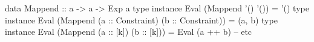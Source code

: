\begin{code}
data Mappend :: a -> a -> Exp a
type instance Eval
  (Mappend '() '()) = '()
type instance Eval
  (Mappend (a :: Constraint)
           (b :: Constraint)) = (a, b)
type instance Eval
  (Mappend (a :: [k])
           (b :: [k])) = Eval (a ++ b)
-- etc
\end{code}
